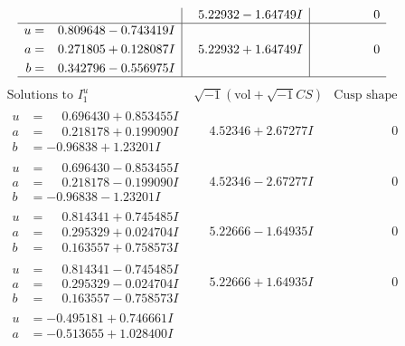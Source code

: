 \documentclass[1p]{elsarticle_modified}
\theoremstyle{definition}
\newcommand{\I}{\sqrt{-1}}
\begin{document}
$$\begin{array}{c|c|c}
 & \phantom{-}5.22932 - 1.64749 I & \phantom{-0.000000 } 0 \\ \hline\begin{aligned}
u &= \phantom{-}0.809648 - 0.743419 I \\
a &= \phantom{-}0.271805 + 0.128087 I \\
b &= \phantom{-}0.342796 - 0.556975 I\end{aligned}
 & \phantom{-}5.22932 + 1.64749 I & \phantom{-0.000000 } 0\\
 \hline 
 \end{array}$$\newpage$$\begin{array}{c|c|c}  
\text{Solutions to }I^u_{1}& \I (\text{vol} + \sqrt{-1}CS) & \text{Cusp shape}\\
 \hline 
\begin{aligned}
u &= \phantom{-}0.696430 + 0.853455 I \\
a &= \phantom{-}0.218178 + 0.199090 I \\
b &= -0.96838 + 1.23201 I\end{aligned}
 & \phantom{-}4.52346 + 2.67277 I & \phantom{-0.000000 } 0 \\ \hline\begin{aligned}
u &= \phantom{-}0.696430 - 0.853455 I \\
a &= \phantom{-}0.218178 - 0.199090 I \\
b &= -0.96838 - 1.23201 I\end{aligned}
 & \phantom{-}4.52346 - 2.67277 I & \phantom{-0.000000 } 0 \\ \hline\begin{aligned}
u &= \phantom{-}0.814341 + 0.745485 I \\
a &= \phantom{-}0.295329 + 0.024704 I \\
b &= \phantom{-}0.163557 + 0.758573 I\end{aligned}
 & \phantom{-}5.22666 - 1.64935 I & \phantom{-0.000000 } 0 \\ \hline\begin{aligned}
u &= \phantom{-}0.814341 - 0.745485 I \\
a &= \phantom{-}0.295329 - 0.024704 I \\
b &= \phantom{-}0.163557 - 0.758573 I\end{aligned}
 & \phantom{-}5.22666 + 1.64935 I & \phantom{-0.000000 } 0 \\ \hline\begin{aligned}
u &= -0.495181 + 0.746661 I \\
a &= -0.513655 + 1.028400 I \\

\end{aligned}
\end{array}$$
\end{document}
